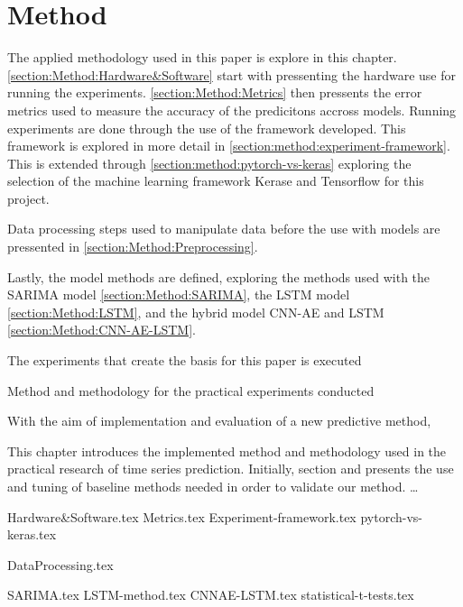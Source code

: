\chapter{Method}
\label{section:Method}

The applied methodology used in this paper is explore in this chapter.
\cref{section:Method:Hardware&Software} start with pressenting the hardware use for running the experiments.
\cref{section:Method:Metrics} then pressents the error metrics used to measure the accuracy of the predicitons accross models.
Running experiments are done through the use of the framework developed. This framework is explored in more detail in \cref{section:method:experiment-framework}.
This is extended through \cref{section:method:pytorch-vs-keras} exploring the selection of the machine learning framework Kerase and Tensorflow for this project.

Data processing steps used to manipulate data before the use with models are pressented in \cref{section:Method:Preprocessing}.

Lastly, the model methods are defined, exploring the methods used with the SARIMA model \cref{section:Method:SARIMA}, the LSTM model \cref{section:Method:LSTM},
and the hybrid model CNN-AE and LSTM \cref{section:Method:CNN-AE-LSTM}.



The experiments that create the basis for this paper is executed

Method and methodology for the practical experiments conducted


With the aim of implementation and evaluation of a new predictive method,

This chapter introduces the implemented method and methodology used in the practical research of time series prediction.
Initially, section  and
 presents the use and tuning of baseline methods needed in order to validate our method.
\dots


{Hardware&Software.tex}
{Metrics.tex}
{Experiment-framework.tex}
{pytorch-vs-keras.tex}

{DataProcessing.tex}


{SARIMA.tex}
{LSTM-method.tex}
{CNNAE-LSTM.tex}
{statistical-t-tests.tex}
